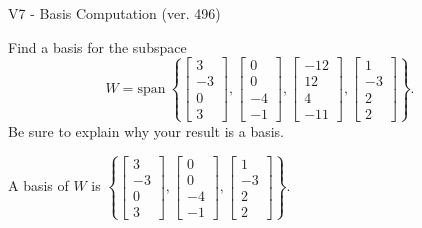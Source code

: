 \begin{exercise}
  \begin{exerciseTitle}V7 - Basis Computation (ver. 496)\end{exerciseTitle}
  \begin{exerciseStatement}
    Find a basis for the subspace 
\[W=\mathrm{span}\ \left\{\left[\begin{array}{r}
3 \\
-3 \\
0 \\
3
\end{array}\right] , \left[\begin{array}{r}
0 \\
0 \\
-4 \\
-1
\end{array}\right] , \left[\begin{array}{r}
-12 \\
12 \\
4 \\
-11
\end{array}\right] , \left[\begin{array}{r}
1 \\
-3 \\
2 \\
2
\end{array}\right]\right\}.\]
 Be sure to explain why your result is a basis.


  \end{exerciseStatement}
  \begin{exerciseAnswer}
   A basis of \(W\) is  \(\left\{\left[\begin{array}{r}
3 \\
-3 \\
0 \\
3
\end{array}\right] , \left[\begin{array}{r}
0 \\
0 \\
-4 \\
-1
\end{array}\right] , \left[\begin{array}{r}
1 \\
-3 \\
2 \\
2
\end{array}\right]\right\}\).
  


  \end{exerciseAnswer}
\end{exercise}